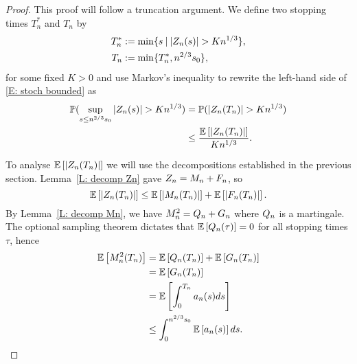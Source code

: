\begin{proof}
	This proof will follow a truncation argument.
	We define two stopping times $T^*_n$ and $T_n$ by
	\begin{align} 
	T^*_n &:= \min \lbrace s \: | \: |Z_n(s)| > K n^{1 / 3} \rbrace, \label{E: def T*n} \\
	T_n &:= \min \lbrace T^*_n, n^{2 / 3}s_0 \rbrace ,  \label{E: def Tn}
	\end{align}
	for some fixed $K>0$ and use Markov's inequality to rewrite the left-hand side of \eqref{E: stoch bounded} as
	\begin{equation} \label{E: stoch bounded 2}
	\begin{aligned}
	\mathbb{P}( \sup_{s\leq n^{2/3} s_0} |Z_n(s)| > K n^{1 / 3} ) &= \mathbb{P}( |Z_n(T_n)| > Kn^{1 / 3} ) \\
	&\leq \frac{\mathbb{E} \left[ |Z_n(T_n)| \right]}{Kn^{1 / 3}}.
	\end{aligned} 
	\end{equation}
	
	To analyse $\mathbb{E} \left[ |Z_n(T_n)| \right]$ we will use the decompositions established in the previous section. 
	Lemma~\ref{L: decomp Zn} gave $Z_n = M_n + F_n$,
	so \begin{equation} \label{E: Exp(|Zn|)}
	\mathbb{E} \left[ |Z_n(T_n)| \right] \leq \mathbb{E} \left[ |M_n(T_n)| \right] + \mathbb{E} \left[ |F_n(T_n)| \right].
	\end{equation}
	By Lemma~\ref{L: decomp Mn}, we have $M^2_n = Q_n + G_n$ where $Q_n$ is a martingale. 
	The optional sampling theorem dictates that 
	$\mathbb{E} \left[ Q_n(\tau) \right] = 0$ 
	for all stopping times $\tau$, hence 
	\begin{align*}
	\mathbb{E} \left[ M^2_n(T_n) \right] 
	&= \mathbb{E} \left[ Q_n(T_n) \right] + \mathbb{E} \left[ G_n(T_n) \right] \\
	&= \mathbb{E} \left[ G_n(T_n) \right] \\
	&= \mathbb{E} \left[  \int_{0}^{T_n} a_n(s)ds  \right] \\
	&\leq \int_{0}^{n^{2 / 3}s_0} \mathbb{E} \left[ a_n(s) \right] ds.
	\end{align*}
	

\end{proof}
